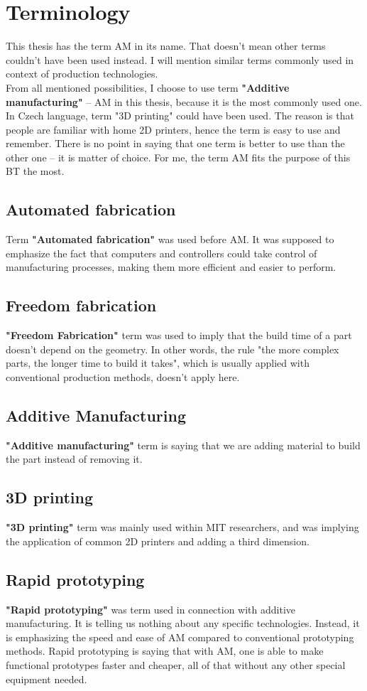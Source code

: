 \documentclass[a4paper, twoside, 11pt]{report}
\begin{document}
\section{Terminology}
This thesis has the term AM in its name. That doesn't mean other terms couldn't have been used instead. I will mention similar terms commonly used in context of production technologies.\\
From all mentioned possibilities, I choose to use term \textbf{"Additive manufacturing"} – AM in this thesis, because it is the most commonly used one. In Czech language, term "3D printing" could have been used. The reason is that people are familiar with home 2D printers, hence the term is easy to use and remember. There is no point in saying that one term is better to use than the other one – it is matter of choice. For me, the term AM fits the purpose of this BT the most.

\subsection{Automated fabrication}
Term \textbf{"Automated fabrication"} was used before AM. It was supposed to emphasize the fact that computers and controllers could take control of manufacturing processes, making them more efficient and easier to perform.
\subsection{Freedom fabrication}
\textbf{"Freedom Fabrication"} term was used to imply that the build time of a part doesn't depend on the geometry. In other words, the rule "the more complex parts, the longer time to build it takes", which is usually applied with conventional production methods, doesn't apply here.
\subsection{Additive Manufacturing}
\textbf{"Additive manufacturing"} term is saying that we are adding material to build the part instead of removing it.
\subsection{3D printing}
\textbf{"3D printing"} term was mainly used within MIT researchers, and was implying the application of common 2D printers and adding a third dimension.
\subsection{Rapid prototyping}
\textbf{"Rapid prototyping"} was term used in connection with additive manufacturing. It is telling us nothing about any specific technologies. Instead, it is emphasizing the speed and ease of AM compared to conventional prototyping methods. Rapid prototyping is saying that with AM, one is able to make functional prototypes faster and cheaper, all of that without any other special equipment needed.\\
\\
\cite[p.~7]{AMT}
%
%
%
\end{document}
